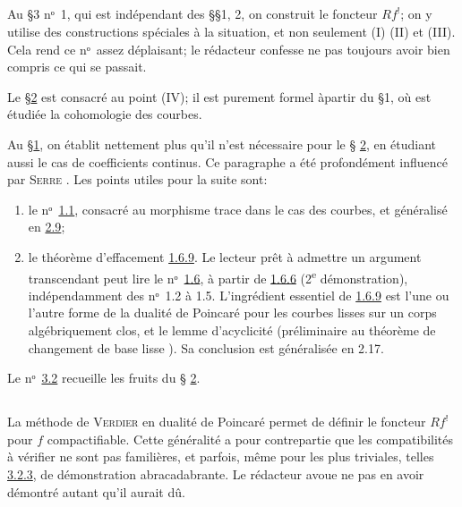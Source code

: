 \documentclass[10pt]{../fichiers-configuration-latex/smfart}
\begin{document}
\subsection{}
Au \S 3 nᵒ 1, qui est indépendant des \S \S 1, 2, on
construit le foncteur $Rf^{!}$; on y utilise des constructions
spéciales à la situation, et non seulement (I) (II) et (III). Cela
rend ce nᵒ assez déplaisant; le rédacteur confesse ne
pas toujours avoir bien compris ce qui se passait.

Le \S \hyperref[XVIII.sec2]{2} est consacré au point (IV); il est purement formel
à\pageoriginale partir du \S 1, où est étudiée la cohomologie des
courbes.

Au \S \hyperref[XVIII.sec1]{1}, on établit nettement plus qu'il n'est nécessaire pour le \S
\hyperref[XVIII.sec2]{2}, en étudiant aussi le cas de coefficients continus. Ce paragraphe a
été profondément influencé par \textsc{Serre} \cite{SGA4-18:6}.
Les points utiles pour la
suite sont:
\begin{enumerate}
\renewcommand{\theenumi}{\alph{enumi}}
\renewcommand{\labelenumi}{\theenumi)}
\item le nᵒ \hyperref[XVIII.subsec1.1]{1.1}, consacré au morphisme trace dans le
  cas des courbes, et généralisé en \hyperref[XVIII.thm2.9]{2.9};

\item le théorème d'effacement \hyperref[XVIII.lemfond1.6.9]{1.6.9}. Le lecteur prêt à admettre un
  argument transcendant peut lire le nᵒ \hyperref[XVIII.subsec1.6]{1.6}, à partir
  de \hyperref[XVIII.lem1.6.6]{1.6.6} (2\textsuperscript{e} démonstration), indépendamment des nᵒ 1.2
  à 1.5.
  L'ingrédient essentiel de \hyperref[XVIII.lemfond1.6.9]{1.6.9} est l'une ou l'autre
  forme de la dualité de Poincaré pour les courbes lisses sur un corps
  algébriquement clos, et le lemme d'acyclicité  (préliminaire
  au théorème de changement de base lisse ). Sa conclusion est
  généralisée en 2.17.
\end{enumerate}

Le nᵒ \hyperref[XVIII.subsec3.2]{3.2} recueille les fruits du \S
\hyperref[XVIII.sec2]{2}. 

\subsection{}
La méthode de \textsc{Verdier} en dualité de Poincaré permet de définir le
foncteur $Rf^{!}$ pour $f$ compactifiable. Cette généralité a pour
contrepartie que les compatibilités à vérifier ne sont pas familières,
et parfois, même pour les plus triviales, telles \hyperref[XVIII.lem3.2.3]{3.2.3}, de
démonstration abracadabrante. Le rédacteur avoue ne pas en avoir
démontré autant qu'il aurait dû.
\end{document}
